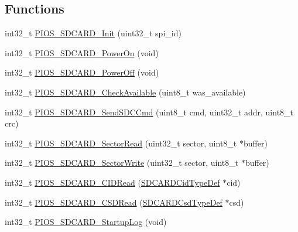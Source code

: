 \subsection*{\-Functions}
\begin{DoxyCompactItemize}
\item 
int32\-\_\-t \hyperlink{group___p_i_o_s___s_d_c_a_r_d_gafcf19e938cb1102c075e231a0422361d}{\-P\-I\-O\-S\-\_\-\-S\-D\-C\-A\-R\-D\-\_\-\-Init} (uint32\-\_\-t spi\-\_\-id)
\item 
int32\-\_\-t \hyperlink{group___p_i_o_s___s_d_c_a_r_d_ga23ea31da97543b106a04b4bf33d844e5}{\-P\-I\-O\-S\-\_\-\-S\-D\-C\-A\-R\-D\-\_\-\-Power\-On} (void)
\item 
int32\-\_\-t \hyperlink{group___p_i_o_s___s_d_c_a_r_d_gaac93bac78ab965688f0dde791eb1c048}{\-P\-I\-O\-S\-\_\-\-S\-D\-C\-A\-R\-D\-\_\-\-Power\-Off} (void)
\item 
int32\-\_\-t \hyperlink{group___p_i_o_s___s_d_c_a_r_d_gada5c80d2151f7b9a68c35861cc5d2923}{\-P\-I\-O\-S\-\_\-\-S\-D\-C\-A\-R\-D\-\_\-\-Check\-Available} (uint8\-\_\-t was\-\_\-available)
\item 
int32\-\_\-t \hyperlink{group___p_i_o_s___s_d_c_a_r_d_ga06575fc4cc50c8f4856d5fd5bde3450b}{\-P\-I\-O\-S\-\_\-\-S\-D\-C\-A\-R\-D\-\_\-\-Send\-S\-D\-C\-Cmd} (uint8\-\_\-t cmd, uint32\-\_\-t addr, uint8\-\_\-t crc)
\item 
int32\-\_\-t \hyperlink{group___p_i_o_s___s_d_c_a_r_d_gaf68bf693b2b96af5862f021bbd0753d3}{\-P\-I\-O\-S\-\_\-\-S\-D\-C\-A\-R\-D\-\_\-\-Sector\-Read} (uint32\-\_\-t sector, uint8\-\_\-t $\ast$buffer)
\item 
int32\-\_\-t \hyperlink{group___p_i_o_s___s_d_c_a_r_d_ga403eed1235aab15c3f4dffd530359a41}{\-P\-I\-O\-S\-\_\-\-S\-D\-C\-A\-R\-D\-\_\-\-Sector\-Write} (uint32\-\_\-t sector, uint8\-\_\-t $\ast$buffer)
\item 
int32\-\_\-t \hyperlink{group___p_i_o_s___s_d_c_a_r_d_gac315de3fafd3370f39b241ec5b7a62ca}{\-P\-I\-O\-S\-\_\-\-S\-D\-C\-A\-R\-D\-\_\-\-C\-I\-D\-Read} (\hyperlink{struct_s_d_c_a_r_d_cid_type_def}{\-S\-D\-C\-A\-R\-D\-Cid\-Type\-Def} $\ast$cid)
\item 
int32\-\_\-t \hyperlink{group___p_i_o_s___s_d_c_a_r_d_gaee8853b1431664b014c45d438c4fb094}{\-P\-I\-O\-S\-\_\-\-S\-D\-C\-A\-R\-D\-\_\-\-C\-S\-D\-Read} (\hyperlink{struct_s_d_c_a_r_d_csd_type_def}{\-S\-D\-C\-A\-R\-D\-Csd\-Type\-Def} $\ast$csd)
\item 
int32\-\_\-t \hyperlink{group___p_i_o_s___s_d_c_a_r_d_ga2a97c001315383e1e5bee1beb6bd9b93}{\-P\-I\-O\-S\-\_\-\-S\-D\-C\-A\-R\-D\-\_\-\-Startup\-Log} (void)

\end{DoxyCompactItemize}
